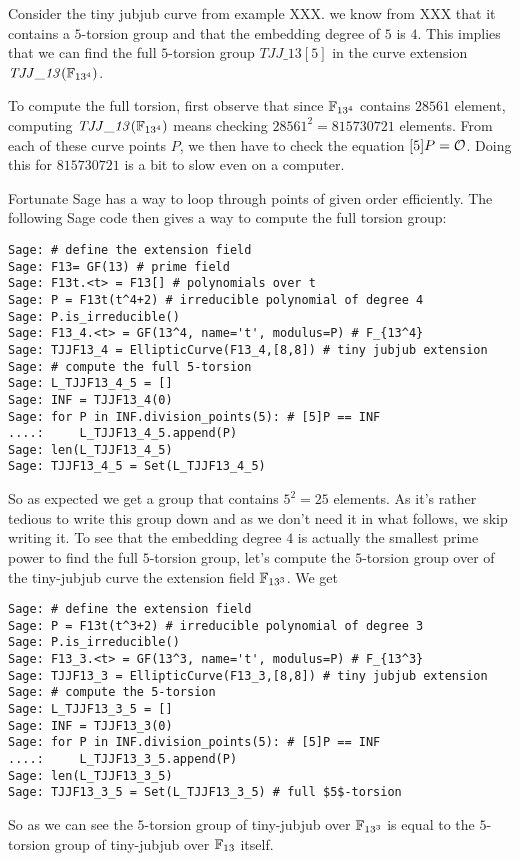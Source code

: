\begin{example} Consider the tiny jubjub curve from example XXX. we know from XXX that it contains a $5$-torsion group and that the embedding degree of $5$ is $4$. This implies that we can find the full $5$-torsion group $\mathit{TJJ\_13}[5]$ in the curve extension $\mathit{TJJ\_13}(\mathbb{F}_{13^4})$. 

To compute the full torsion, first observe that since $\mathbb{F}_{13^4}$ contains $28561$ element, computing $\mathit{TJJ\_13}(\mathbb{F}_{13^4})$ means checking $28561^2=815730721$ elements. From each of these curve points $P$, we then have to check the equation $[5]P=\mathcal{O}$. Doing this for $815730721$ is a bit to slow even on a computer.

Fortunate Sage has a way to loop through points of given order efficiently. The following Sage code then gives a way to compute the full torsion group:
\begin{verbatim}
Sage: # define the extension field
Sage: F13= GF(13) # prime field
Sage: F13t.<t> = F13[] # polynomials over t
Sage: P = F13t(t^4+2) # irreducible polynomial of degree 4
Sage: P.is_irreducible()
Sage: F13_4.<t> = GF(13^4, name='t', modulus=P) # F_{13^4}
Sage: TJJF13_4 = EllipticCurve(F13_4,[8,8]) # tiny jubjub extension
Sage: # compute the full 5-torsion
Sage: L_TJJF13_4_5 = []
Sage: INF = TJJF13_4(0)
Sage: for P in INF.division_points(5): # [5]P == INF
....:     L_TJJF13_4_5.append(P)
Sage: len(L_TJJF13_4_5)
Sage: TJJF13_4_5 = Set(L_TJJF13_4_5)
\end{verbatim}
So as expected we get a group that contains $5^2=25$ elements. As it's rather tedious to write this group down and as we don't need it in what follows, we skip writing it. To see that the embedding degree $4$ is actually the smallest prime power to find the full $5$-torsion group, let's compute the $5$-torsion group over of the tiny-jubjub curve the extension field $\mathbb{F}_{13^3}$. We get 
\begin{verbatim}
Sage: # define the extension field
Sage: P = F13t(t^3+2) # irreducible polynomial of degree 3
Sage: P.is_irreducible()
Sage: F13_3.<t> = GF(13^3, name='t', modulus=P) # F_{13^3}
Sage: TJJF13_3 = EllipticCurve(F13_3,[8,8]) # tiny jubjub extension
Sage: # compute the 5-torsion
Sage: L_TJJF13_3_5 = []
Sage: INF = TJJF13_3(0)
Sage: for P in INF.division_points(5): # [5]P == INF
....:     L_TJJF13_3_5.append(P)
Sage: len(L_TJJF13_3_5)
Sage: TJJF13_3_5 = Set(L_TJJF13_3_5) # full $5$-torsion
\end{verbatim}
So as we can see the $5$-torsion group of tiny-jubjub over $\mathbb{F}_{13^3}$ is equal to the $5$-torsion group of tiny-jubjub over $\mathbb{F}_{13}$ itself. 
\end{example}
